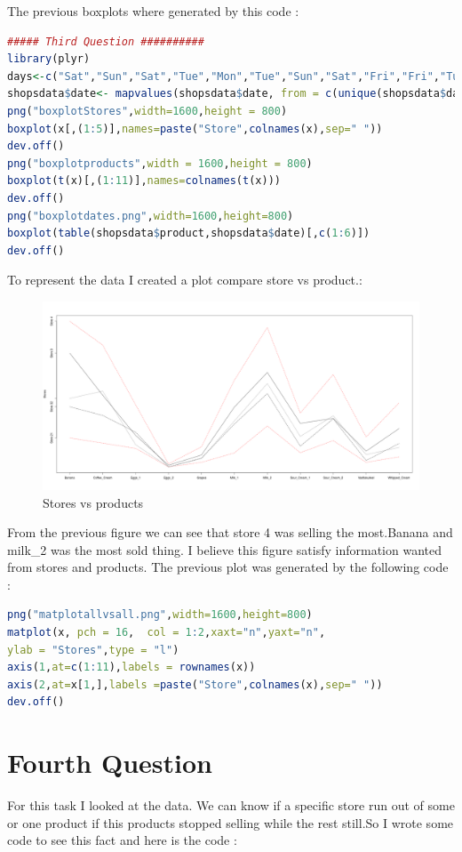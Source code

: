 \documentclass{article}
\begin{document}
The previous boxplots where generated by this code :
\begin{lstlisting}[language=R]
##### Third Question ##########
library(plyr)
days<-c("Sat","Sun","Sat","Tue","Mon","Tue","Sun","Sat","Fri","Fri","Tue","Wed")
shopsdata$date<- mapvalues(shopsdata$date, from = c(unique(shopsdata$date)), to = days)
png("boxplotStores",width=1600,height = 800)
boxplot(x[,(1:5)],names=paste("Store",colnames(x),sep=" "))
dev.off()
png("boxplotproducts",width = 1600,height = 800)
boxplot(t(x)[,(1:11)],names=colnames(t(x)))
dev.off()
png("boxplotdates.png",width=1600,height=800)
boxplot(table(shopsdata$product,shopsdata$date)[,c(1:6)])
dev.off()
\end{lstlisting}
To represent the data I created a plot compare store vs product.:
\begin{figure}[H]
\begin{center}
	\includegraphics[scale=0.3]{matplotallvsall.png}
\end{center}
\caption{Stores vs products}
	
\end{figure} 
From the previous figure we can see that store 4 was selling the most.Banana and milk\_2 was the most sold thing. I believe this figure satisfy information wanted from stores and products.
The previous plot was generated by the following code : 
\begin{lstlisting}[language=R]
png("matplotallvsall.png",width=1600,height=800)
matplot(x, pch = 16,  col = 1:2,xaxt="n",yaxt="n",
ylab = "Stores",type = "l")
axis(1,at=c(1:11),labels = rownames(x))
axis(2,at=x[1,],labels =paste("Store",colnames(x),sep=" "))
dev.off()
\end{lstlisting}
		{\centering \section*{Fourth Question}}
For this task  I looked at the data. We can know if a specific store run out of some or one product if this products stopped selling while the rest still.So I wrote some code to see this fact and here is the code :
\end{document}
